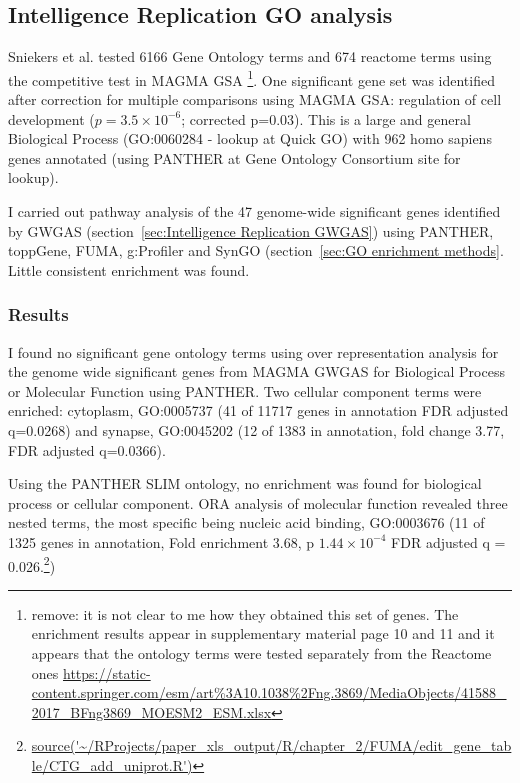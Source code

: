
\subsection{Intelligence Replication GO analysis}
Sniekers et al. tested 6166 Gene Ontology terms and 674 reactome terms using the competitive test in MAGMA GSA  \footnote{remove: it is not clear to me how they obtained this set of genes. The enrichment results appear in supplementary material page 10 and 11 and it appears that the ontology terms were tested separately from the Reactome ones
\url{https://static-content.springer.com/esm/art\%3A10.1038\%2Fng.3869/MediaObjects/41588_2017_BFng3869_MOESM2_ESM.xlsx}}. 
 One significant gene set was identified after correction for multiple comparisons using MAGMA GSA: regulation of cell development ($p=3.5 \times 10^{-6}$; corrected p=0.03)\cite{sniekers2017genome}. This is a large and general Biological Process (GO:0060284 - lookup at Quick GO)  with 962 homo sapiens genes annotated (using PANTHER at Gene Ontology Consortium site for lookup).

I carried out pathway analysis of the 47 genome-wide significant genes identified by GWGAS (section~\ref{sec:Intelligence Replication GWGAS}) using PANTHER\cite{mi2013large}, toppGene\cite{chen2009toppgene}, FUMA\cite{watanabe2017functional}, g:Profiler\cite{raudvere2019g} and SynGO\cite{koopmans2019syngo} (section~\ref{sec:GO enrichment methods}. Little consistent enrichment was found. 


\subsubsection{Results}
I found no significant gene ontology terms using over representation analysis for the genome wide significant genes from MAGMA GWGAS for Biological Process or Molecular Function using PANTHER. Two cellular component terms were enriched: cytoplasm, GO:0005737 (41 of 11717 genes in annotation FDR adjusted q=0.0268) and synapse, GO:0045202 (12 of 1383 in annotation, fold change 3.77, FDR adjusted q=0.0366). 

Using the PANTHER SLIM ontology, no enrichment was found for biological process or cellular component. ORA analysis of molecular function revealed three nested terms, the most specific being nucleic acid binding, GO:0003676  (11 of 1325 genes in annotation, Fold enrichment 3.68, p $1.44\times10^{-4}$ FDR adjusted q = 0.026.\footnote{\url{source('~/RProjects/paper_xls_output/R/chapter_2/FUMA/edit_gene_table/CTG_add_uniprot.R')}})

